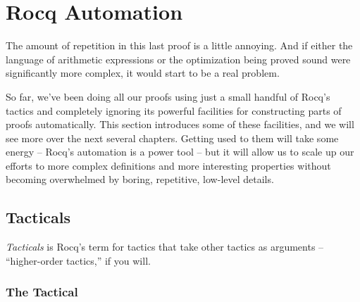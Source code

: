 \documentclass[12pt]{report}
\begin{document}
\section{Rocq Automation}



 The amount of repetition in this last proof is a little
    annoying.  And if either the language of arithmetic expressions or
    the optimization being proved sound were significantly more
    complex, it would start to be a real problem.


    So far, we've been doing all our proofs using just a small handful
    of Rocq's tactics and completely ignoring its powerful facilities
    for constructing parts of proofs automatically.  This section
    introduces some of these facilities, and we will see more over the
    next several chapters.  Getting used to them will take some
    energy -- Rocq's automation is a power tool -- but it will allow us
    to scale up our efforts to more complex definitions and more
    interesting properties without becoming overwhelmed by boring,
    repetitive, low-level details. 
\begin{coqdoccode}
\coqdocemptyline
\end{coqdoccode}
\subsection{Tacticals}



 \textit{Tacticals} is Rocq's term for tactics that take other tactics as
    arguments -- ``higher-order tactics,'' if you will.  
\begin{coqdoccode}
\coqdocemptyline
\end{coqdoccode}
\subsubsection{The \texorpdfstring{\protect{}}{try} Tactical}
\end{document}

